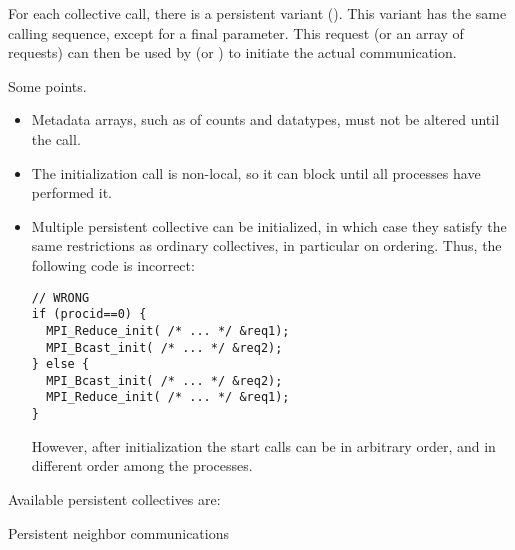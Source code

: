 \begin{mpifour}
For each collective call, there is a persistent variant ().
This variant has the same calling sequence, except for a final
 parameter.
This request (or an array of requests) can then be used by
 (or )
to initiate the actual communication.

Some points.
\begin{itemize}
\item
  Metadata arrays, such as of counts and datatypes,
  must not be altered until the  call.
\item The initialization call is non-local, so it can block until all
  processes have performed it.
\item Multiple persistent collective can be initialized, in which case
  they satisfy the same restrictions as ordinary collectives, in particular
  on ordering. Thus, the following code is incorrect:
\begin{lstlisting}
// WRONG
if (procid==0) {
  MPI_Reduce_init( /* ... */ &req1);
  MPI_Bcast_init( /* ... */ &req2);
} else {
  MPI_Bcast_init( /* ... */ &req2);
  MPI_Reduce_init( /* ... */ &req1);
}
\end{lstlisting}
However, after initialization the start calls can be in arbitrary order,
and in different order among the processes.
\end{itemize}

\begin{raggedright}
  Available persistent collectives are:
\end{raggedright}

\end{mpifour}

 {Persistent neighbor communications}

